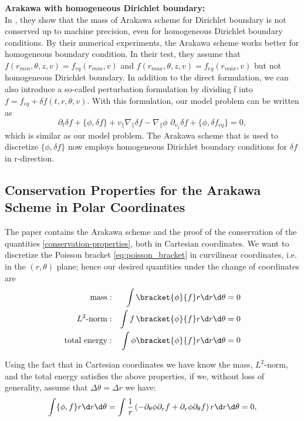 \textbf{Arakawa with homogeneous Dirichlet boundary:}\\
In \cite{crouseilles2018exponential}, they show that the mass of Arakawa scheme for Dirichlet boundary is not conserved up to machine precision, even for homogeneous Dirichlet boundary conditions. By their numerical experiments, the Arakawa scheme works better for homogeneous boundary condition. In their test, they assume that $f(r_{min}, \theta,z,v)=f_{eq}(r_{min},v)$ and $f(r_{max}, \theta,z,v)=f_{eq}(r_{max},v)$ but not homogeneous Dirichlet boundary. In addition to the direct formulation, we can also introduce a so-called perturbation formulation by dividing f into $f=f_{eq}+\delta f(t,r,\theta,v)$. With this formulation, our model problem can be written as 
\begin{equation}
 \partial_t \delta f + \{\phi, \delta f \} + v_\parallel \nabla_\parallel \delta f - \nabla_\parallel \phi\,\, \partial_{v_\parallel} \delta f + \{\phi, \delta f_{eq} \}= 0,
\end{equation} 
which is similar as our model problem. The Arakawa scheme that is used to discretize $\{\phi, \delta f \}$ now employs homogeneous Dirichlet boundary conditions for $\delta f$ in r-direction.





\subsection{Conservation Properties for the Arakawa Scheme in Polar Coordinates}

The paper \cite{Arakawa_1966} contains the Arakawa scheme and the proof of the conservation of the quantities \eqref{conservation-properties}, both in Cartesian coordinates. We want to discretize the Poisson bracket \eqref{eq:poisson_bracket} in curvilinear coordinates, i.e. in the $(r,\theta)$ plane; hence our desired quantities under the change of coordinates are
\begin{align*}
\text{mass} : && \int\bracket{\phi}{f}r \d r \d \theta & = 0 \\
L^2\text{-norm} : && \int f \, \bracket{\phi}{f}r \d r \d \theta & = 0 \\
\text{total energy} : && \int \phi \bracket{\phi}{f}r \d r \d \theta & = 0
\end{align*}

Using the fact that in Cartesian coordinates we have know the mass, $L^2$-norm, and the total energy satisfies the above properties, if we, without loss of generality, assume that $\Delta\theta=\Delta r$ we have:
\begin{equation*}
\int \{{\phi, f}\} r \d r \d \theta = \int \frac{1}{r} \left(-\partial_\theta \phi \partial_r f + \partial_r \phi \partial_\theta f \right) r \d r \d \theta = 0 ,
\end{equation*}

